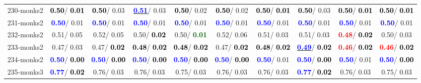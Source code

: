 \begin{table}[h]
\begin{center}
{\begin{tabular}{lc|c|c|c|c|c|c|c|c}
230-monks2 & \textcolor{black}{\textbf{  0.50}}/\textcolor{black}{\textbf{  0.01}} & \textcolor{black}{\textbf{  0.50}}/  0.03 & \underline{\textcolor{blue}{\textbf{  0.51}}}/  0.03 & \textcolor{black}{\textbf{  0.50}}/  0.02 & \textcolor{black}{\textbf{  0.50}}/  0.02 & \textcolor{black}{\textbf{  0.50}}/\textcolor{black}{\textbf{  0.01}} & \textcolor{black}{\textbf{  0.50}}/  0.03 & \textcolor{black}{\textbf{  0.50}}/\textcolor{black}{\textbf{  0.01}} & \textcolor{black}{\textbf{  0.50}}/\textcolor{black}{\textbf{  0.01}} \\
231-monks2 & \textcolor{blue}{\textbf{  0.50}}/  0.01 & \textcolor{blue}{\textbf{  0.50}}/  0.01 & \textcolor{blue}{\textbf{  0.50}}/  0.01 & \textcolor{blue}{\textbf{  0.50}}/  0.01 & \textcolor{blue}{\textbf{  0.50}}/  0.01 & \textcolor{blue}{\textbf{  0.50}}/  0.01 & \textcolor{blue}{\textbf{  0.50}}/  0.01 & \textcolor{blue}{\textbf{  0.50}}/  0.01 & \textcolor{blue}{\textbf{  0.50}}/  0.01 \\ \hline
232-monks2 &   0.51/  0.05 &   0.52/  0.05 &   0.50/\textcolor{black}{\textbf{  0.02}} &   0.50/\textcolor{darkgreen}{\textbf{  0.01}} &   0.52/  0.06 &   0.51/  0.03 &   0.51/  0.03 & \textcolor{red}{\textbf{  0.48}}/\textcolor{black}{\textbf{  0.02}} &   0.50/  0.03 \\
233-monks2 &   0.47/  0.03 &   0.47/\textcolor{black}{\textbf{  0.02}} & \textcolor{black}{\textbf{  0.48}}/\textcolor{black}{\textbf{  0.02}} & \textcolor{black}{\textbf{  0.48}}/\textcolor{black}{\textbf{  0.02}} &   0.47/\textcolor{black}{\textbf{  0.02}} & \textcolor{black}{\textbf{  0.48}}/\textcolor{black}{\textbf{  0.02}} & \underline{\textcolor{blue}{\textbf{  0.49}}}/\textcolor{black}{\textbf{  0.02}} & \textcolor{red}{\textbf{  0.46}}/\textcolor{black}{\textbf{  0.02}} & \textcolor{red}{\textbf{  0.46}}/\textcolor{black}{\textbf{  0.02}} \\
234-monks2 & \textcolor{blue}{\textbf{  0.50}}/\textcolor{black}{\textbf{  0.00}} & \textcolor{blue}{\textbf{  0.50}}/\textcolor{black}{\textbf{  0.00}} & \textcolor{blue}{\textbf{  0.50}}/\textcolor{black}{\textbf{  0.00}} & \textcolor{blue}{\textbf{  0.50}}/\textcolor{black}{\textbf{  0.00}} & \textcolor{blue}{\textbf{  0.50}}/\textcolor{black}{\textbf{  0.00}} & \textcolor{blue}{\textbf{  0.50}}/  0.01 & \textcolor{blue}{\textbf{  0.50}}/\textcolor{black}{\textbf{  0.00}} & \textcolor{blue}{\textbf{  0.50}}/  0.01 & \textcolor{blue}{\textbf{  0.50}}/\textcolor{black}{\textbf{  0.00}} \\
235-monks3 & \textcolor{blue}{\textbf{  0.77}}/\textcolor{black}{\textbf{  0.02}} &   0.76/  0.03 &   0.76/  0.03 &   0.75/  0.03 &   0.76/  0.03 &   0.76/  0.03 & \textcolor{blue}{\textbf{  0.77}}/\textcolor{black}{\textbf{  0.02}} &   0.76/  0.03 &   0.75/  0.03 \\

\end{tabular}}
\end{center}
\end{table}
